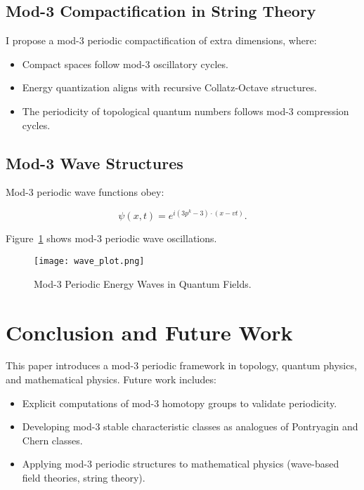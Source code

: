 \documentclass{article}
\begin{document}
\subsection{Mod-3 Compactification in String Theory}

I propose a mod-3 periodic compactification of extra dimensions, where:

\begin{itemize}
    \item Compact spaces follow mod-3 oscillatory cycles.
    \item Energy quantization aligns with recursive Collatz-Octave structures.
    \item The periodicity of topological quantum numbers follows mod-3 compression cycles.
\end{itemize}

\subsection{Mod-3 Wave Structures}

Mod-3 periodic wave functions obey:

\begin{equation}
\psi(x,t) = e^{i(3p^k - 3) \cdot (x - vt)}.
\end{equation}

Figure~\ref{fig:waves} shows mod-3 periodic wave oscillations.

\begin{figure}[h]
    \centering
    \texttt{[image: wave\_plot.png]}
    \caption{Mod-3 Periodic Energy Waves in Quantum Fields.}
    \label{fig:waves}
\end{figure}

\section{Conclusion and Future Work}

This paper introduces a mod-3 periodic framework in topology, quantum physics, and mathematical physics. Future work includes:

\begin{itemize}
    \item Explicit computations of mod-3 homotopy groups to validate periodicity.
    \item Developing mod-3 stable characteristic classes as analogues of Pontryagin and Chern classes.
    \item Applying mod-3 periodic structures to mathematical physics (wave-based field theories, string theory).
\end{itemize}
\end{document}
